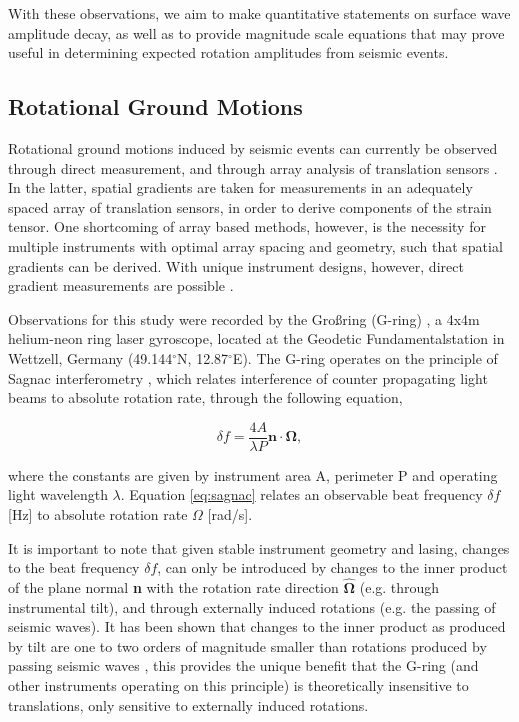 \documentclass{gji}
\begin{document}
With these observations, we aim to make quantitative statements on surface wave amplitude decay, as well as to provide magnitude scale equations that may prove useful in determining expected rotation amplitudes from seismic events.

\subsection{Rotational Ground Motions}
Rotational ground motions induced by seismic events can currently be observed through direct measurement, and through array analysis of translation sensors \cite{spudich1995transient}.
In the latter, spatial gradients are taken for measurements in an adequately spaced array of translation sensors, in order to derive components of the strain tensor. One shortcoming of array based methods, however, is the necessity for multiple instruments with optimal array spacing and geometry, such that spatial gradients can be derived. With unique instrument designs, however, direct gradient measurements are  possible \cite{schreiber2006ring}. %

Observations for this study were recorded by the Gro\ss ring (G-ring) \cite{schreiber2006ring} , a 4x4m helium-neon ring laser gyroscope, located at the Geodetic Fundamentalstation in Wettzell, Germany (49.144$^\circ$N, 12.87$^\circ$E). The G-ring operates on the principle of Sagnac interferometry \cite{stedman1997ring}, which relates interference of counter propagating light beams to absolute rotation rate, through the following equation, 

\begin{equation}\label{eq:sagnac}
	\delta f = \frac{4A}{\lambda P}\mathbf{n}\cdot \mathbf{\Omega},
\end{equation}

\noindent where the constants are given by instrument area A, perimeter P and operating light wavelength $\lambda$. Equation \ref{eq:sagnac} relates an observable beat frequency $\delta f$ [Hz] to absolute rotation rate $\Omega$ [rad/s].

It is important to note that given stable instrument geometry and lasing, changes to the beat frequency $\delta f$, can only be introduced by changes to the inner product of the plane normal {\bfseries n} with the rotation rate direction $\mathbf{\hat{\Omega}}$ (e.g. through instrumental tilt), and through externally induced rotations (e.g. the passing of seismic waves). It has been shown that changes to the inner product as produced by tilt are one to two orders of magnitude smaller than rotations produced by passing seismic waves \cite{mcleod1998comparison} \cite{schreiber2006ring} , this provides the unique benefit that the G-ring (and other instruments operating on this principle) is theoretically insensitive to translations, only sensitive to externally induced rotations.
\end{document}
